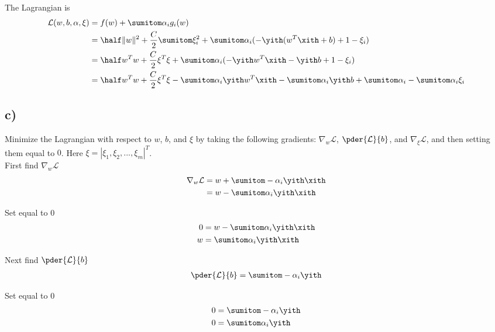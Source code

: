 \documentclass[11pt]{article}
\begin{document}
The Lagrangian is
\begin{align*}
  \mathcal{L}(w,b,\alpha,\xi) &= f(w) + \sumitom \alpha_i g_i(w) \\
  &= \half \|w\|^2 + \frac{C}{2} \sumitom \xi_i^2 + \sumitom \alpha_i (-\yith (w^T \xith + b) + 1 - \xi_i) \\
  &= \half w^T w + \frac{C}{2} \xi^T \xi + \sumitom \alpha_i (-\yith w^T \xith - \yith b + 1 - \xi_i) \\
  &= \half w^T w + \frac{C}{2} \xi^T \xi - \sumitom \alpha_i \yith w^T \xith - \sumitom \alpha_i \yith b + \sumitom \alpha_i - \sumitom \alpha_i \xi_i \\
\end{align*}

\subsection*{c)}

Minimize the Lagrangian with respect to $w$, $b$, and $\xi$ by taking the following gradients: $\nabla_w \mathcal{L}$, $\pder{\mathcal{L}}{b}$, and $\nabla_{\xi} \mathcal{L}$, and then setting them equal to $0$. Here $\xi = |\xi_1,\xi_2,...,\xi_m|^{T}$. \\

First find $\nabla_w \mathcal{L}$
\begin{align*}
  \nabla_w \mathcal{L} &= w + \sumitom -\alpha_i \yith \xith \\
                       &= w - \sumitom \alpha_i \yith \xith \\
\end{align*}

Set equal to 0
\begin{align*}
                     0 &= w - \sumitom \alpha_i \yith \xith \\
                     w &= \sumitom \alpha_i \yith \xith \\
\end{align*}

Next find $\pder{\mathcal{L}}{b}$
\begin{align*}
  \pder{\mathcal{L}}{b} &= \sumitom -\alpha_i \yith \\
\end{align*}

Set equal to 0
\begin{align*}
  0 &= \sumitom -\alpha_i \yith \\
  0 &= \sumitom \alpha_i \yith \\
\end{align*}
\end{document}
